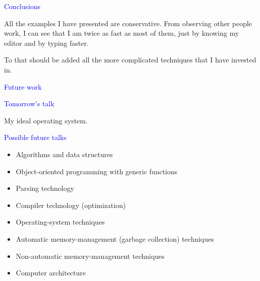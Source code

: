 \documentclass{slides}
\newcommand{\ti}[1]{\begin{center}\Large{\textcolor{blue}{#1}}\end{center}}
\begin{document}
\begin{slide}\ti{}

\vfill\end{slide}
\begin{slide}\ti{Conclusions}

All the examples I have presented are conservative.  From observing
other people work, I can see that I am twice as fast as most of them,
just by knowing my editor and by typing faster.

To that should be added all the more complicated techniques that I
have invested in.

\vfill\end{slide}
\begin{slide}\ti{Future work}

\vfill\end{slide}
\begin{slide}\ti{Tomorrow's talk}

My ideal operating system.

\vfill\end{slide}
\begin{slide}\ti{Possible future talks}

  \begin{itemize}
  \item Algorithms and data structures
  \item Object-oriented programming with generic functions
  \item Parsing technology
  \item Compiler technology (optimization)
  \item Operating-system techniques
  \item Automatic memory-management (garbage collection) techniques
  \item Non-automatic memory-management techniques
  \item Computer architecture
  \end{itemize}

\vfill\end{slide}



\end{document}
